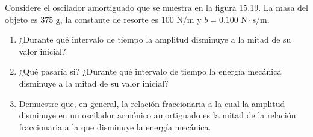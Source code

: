 \item Considere el oscilador amortiguado que se muestra en la figura 15.19. La masa del objeto es $375\text{ g}$, la constante de resorte es $100\text{ N/m}$ y $b = 0.100\text{ N}\cdot\text{s/m}$.
\begin{enumerate}
    \item ¿Durante qué intervalo de tiempo la amplitud disminuye a la mitad de su valor inicial?
    \item ¿Qué pasaría si? ¿Durante qué intervalo de tiempo la energía mecánica disminuye a la mitad de su valor inicial?
    \item Demuestre que, en general, la relación fraccionaria a la cual la amplitud disminuye en un oscilador armónico amortiguado es la mitad de la relación fraccionaria a la que disminuye la energía mecánica.
\end{enumerate}